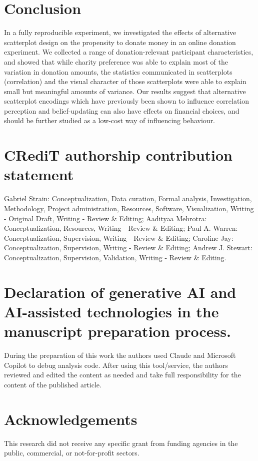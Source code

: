 \documentclass[
  authoryear,
  preprint,
  3p]{elsarticle}
\begin{document}
\section{Conclusion}\label{sec-conclusion}

In a fully reproducible experiment, we investigated the effects of
alternative scatterplot design on the propensity to donate money in an
online donation experiment. We collected a range of donation-relevant
participant characteristics, and showed that while charity preference
was able to explain most of the variation in donation amounts, the
statistics communicated in scatterplots (correlation) and the visual
character of those scatterplots were able to explain small but
meaningful amounts of variance. Our results suggest that alternative
scatterplot encodings which have previously been shown to influence
correlation perception and belief-updating can also have effects on
financial choices, and should be further studied as a low-cost way of
influencing behaviour.

\section*{CRediT authorship contribution
statement}\label{credit-authorship-contribution-statement}

Gabriel Strain: Conceptualization, Data curation, Formal analysis,
Investigation, Methodology, Project administration, Resources, Software,
Visualization, Writing - Original Draft, Writing - Review \& Editing;
Aadityaa Mehrotra: Conceptualization, Resources, Writing - Review \&
Editing; Paul A. Warren: Conceptualization, Supervision, Writing -
Review \& Editing; Caroline Jay: Conceptualization, Supervision, Writing
- Review \& Editing; Andrew J. Stewart: Conceptualization, Supervision,
Validation, Writing - Review \& Editing.

\section*{Declaration of generative AI and AI-assisted technologies in
the manuscript preparation
process.}\label{declaration-of-generative-ai-and-ai-assisted-technologies-in-the-manuscript-preparation-process.}

During the preparation of this work the authors used Claude and
Microsoft Copilot to debug analysis code. After using this tool/service,
the authors reviewed and edited the content as needed and take full
responsibility for the content of the published article.

\section*{Acknowledgements}\label{acknowledgements}

This research did not receive any specific grant from funding agencies
in the public, commercial, or not-for-profit sectors.


\renewcommand\refname{References}

\end{document}
